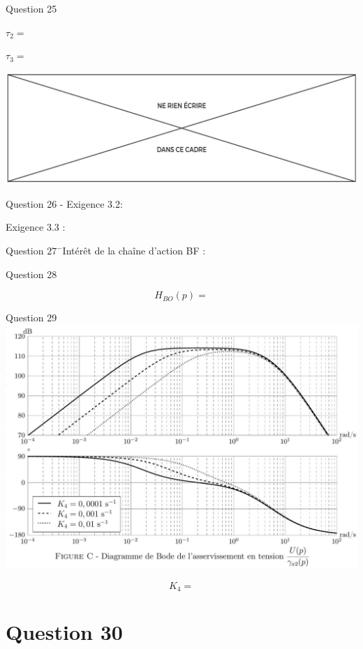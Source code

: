 \documentclass[10pt]{article}
\begin{document}
Question 25

$\tau_{2}=$

$\tau_{3}=$

\begin{center}
\includegraphics[max width=\textwidth]{2024_04_26_3285cfc264024262add0g-33}
\end{center}

Question 26 - Exigence 3.2:

Exigence 3.3 :

Question $27^{-}$Intérêt de la chaîne d'action BF :

Question 28

$$
H_{B O}(p)=
$$

Question 29\\
\includegraphics[max width=\textwidth, center]{2024_04_26_3285cfc264024262add0g-34}

$$
K_{4}=
$$

\section*{Question 30}
\end{document}
